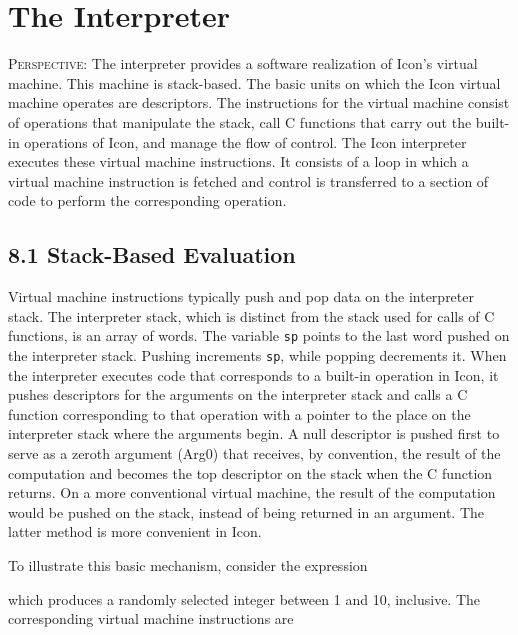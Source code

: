 \chapter{The Interpreter}

\textsc{Perspective}: The interpreter provides a software realization
of Icon's virtual machine. This machine is stack-based. The basic
units on which the Icon virtual machine operates are descriptors. The
instructions for the virtual machine consist of operations that
manipulate the stack, call C functions that carry out the built-in
operations of Icon, and manage the flow of control. The Icon
interpreter executes these virtual machine instructions.  It consists
of a loop in which a virtual machine instruction is fetched and
control is transferred to a section of code to perform the
corresponding operation.

\section[8.1 Stack-Based Evaluation]{8.1 Stack-Based Evaluation}

Virtual machine instructions typically push and pop data on the
interpreter stack. The interpreter stack, which is distinct from the
stack used for calls of C functions, is an array of words. The
variable \texttt{sp} points to the last word pushed on the interpreter
stack. Pushing increments \texttt{sp}, while popping decrements it. When the
interpreter executes code that corresponds to a built-in operation in
Icon, it pushes descriptors for the arguments on the interpreter stack
and calls a C function corresponding to that operation with a pointer
to the place on the interpreter stack where the arguments begin. A
null descriptor is pushed first to serve as a
{\textquotedbl}zeroth{\textquotedbl} argument (Arg0) that receives, by
convention, the result of the computation and becomes the top
descriptor on the stack when the C function returns. On a more
conventional virtual machine, the result of the computation would be
pushed on the stack, instead of being returned in an argument. The
latter method is more convenient in Icon.

To illustrate this basic mechanism, consider the expression


\noindent which produces a randomly selected integer between 1 and 10,
inclusive. The corresponding virtual machine instructions are

\goodbreak
{}


